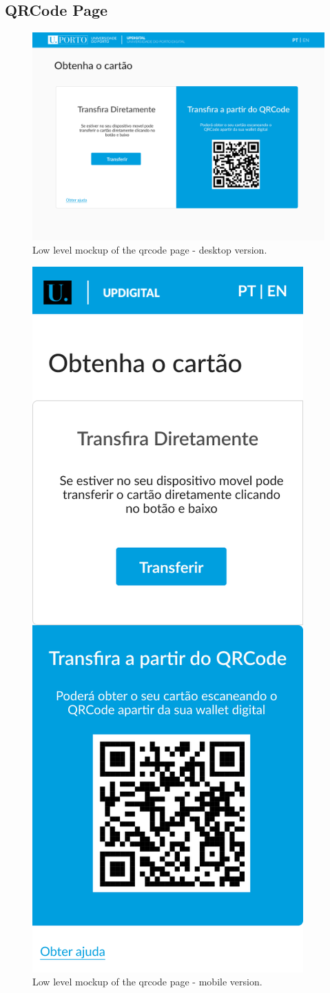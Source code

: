 \documentclass[10pt]{article}
\begin{document}
\clearpage

\subsection{QRCode Page}

\begin{figure}[H]
  \centering
  \includegraphics[width=1\linewidth]{report-images/qrcode-page-desktop.png}
  \caption{Low level mockup of the qrcode page - desktop version.}
  \label{fig:fig-5}
\end{figure}

\begin{figure}[H]
  \centering
  \includegraphics[width=0.25\linewidth]{report-images/qrcode-page-mobile.png}
  \caption{Low level mockup of the qrcode page - mobile version.}
  \label{fig:fig-6}
\end{figure}
\end{document}
